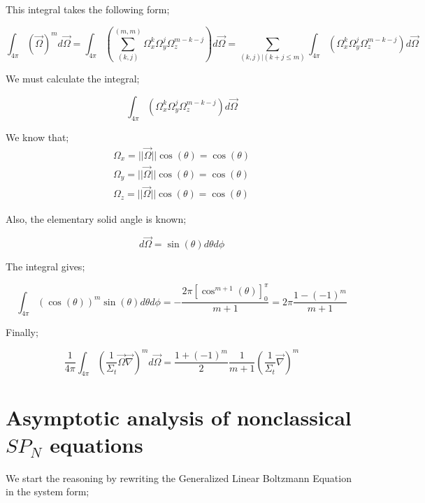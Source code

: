 \documentclass[a4paper, 12pt]{report}
\begin{document}
\begin{appendix}
This integral takes the following form;

\begin{equation}
 \int_{4\pi} \left(\vec{\Omega}\right)^{m}  d\vec{\Omega} =  \int_{4\pi}\left( \sum_{(k,j)}^{(m,m)} \Omega_x^k\Omega_y^j\Omega_z^{m-k-j} \right) d\vec{\Omega} =  \sum_{(k,j)|{(k+j\leq m)}} \int_{4\pi}\left( \Omega_x^k\Omega_y^j\Omega_z^{m-k-j} \right) d\vec{\Omega}
\end{equation}

We must calculate the integral;

\begin{equation}
\int_{4\pi}\left( \Omega_x^k\Omega_y^j\Omega_z^{m-k-j} \right) d\vec{\Omega}
\end{equation}

We know that;
\begin{align}
\Omega_x= ||\vec{\Omega}|| \cos(\theta) = \cos(\theta)\\
\Omega_y= ||\vec{\Omega}|| \cos(\theta) = \cos(\theta)\\
\Omega_z= ||\vec{\Omega}|| \cos(\theta) = \cos(\theta)
\end{align}

Also, the elementary solid angle is known;

\begin{equation}
d\vec{\Omega} = \sin(\theta) d\theta d\phi
\end{equation}

The integral gives;

\begin{equation}
\int_{4\pi}\left(\cos(\theta) \right)^m \sin(\theta) d\theta d\phi = -\frac{2\pi \left[\cos^{m+1}(\theta)\right]^\pi_0}{m+1} = 2\pi\frac{1-(-1)^m}{m+1}
\end{equation}

Finally;

\begin{equation}
\frac{1}{4\pi}\int_{4\pi} \left(\frac{1}{\Sigma_t}\vec{\Omega}\vec{\nabla}\right)^m d\vec{\Omega} = \frac{1+(-1)^m}{2}\frac{1}{m+1} \left(\frac{1}{\Sigma_t}\vec{\nabla}\right)^m
\end{equation}

\chapter{Asymptotic analysis of nonclassical $SP_N$ equations}\label{B}

We start the reasoning by rewriting the Generalized Linear Boltzmann Equation in the system form;


\end{appendix}
\end{document}
